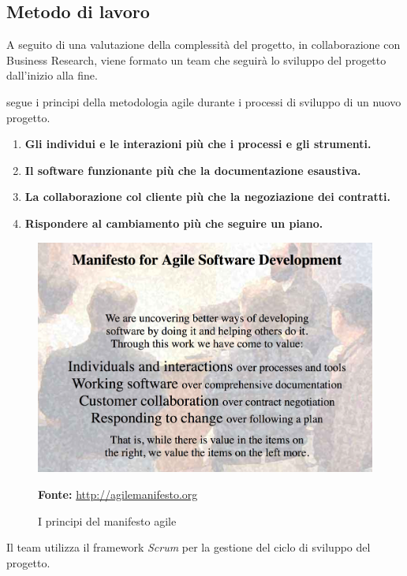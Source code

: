 \subsection{Metodo di lavoro}
A seguito di una valutazione della complessità del progetto, in collaborazione con Business Research, viene formato un team che seguirà lo sviluppo del progetto dall'inizio alla fine.

\lab{} segue i principi della metodologia agile durante i processi di sviluppo di un nuovo progetto.
\begin{enumerate}
\item \textbf{Gli individui e le interazioni più che i processi e gli strumenti.}\\
\item \textbf{Il software funzionante più che la documentazione esaustiva.}\\
\item \textbf{La collaborazione col cliente più che la negoziazione dei contratti.}\\
\item \textbf{Rispondere al cambiamento più che seguire un piano.}\\
\end{enumerate}

\begin{figure}[H]
	\begin{center}
	\includegraphics[scale=0.25]{immagini/agile_manifesto.png}
	\caption{I principi del manifesto agile}
	\small{\textbf{Fonte:} \url{http://agilemanifesto.org}}
	\end{center}
\end{figure}

Il team utilizza il framework \textit{Scrum} per la gestione del ciclo di sviluppo del progetto.

